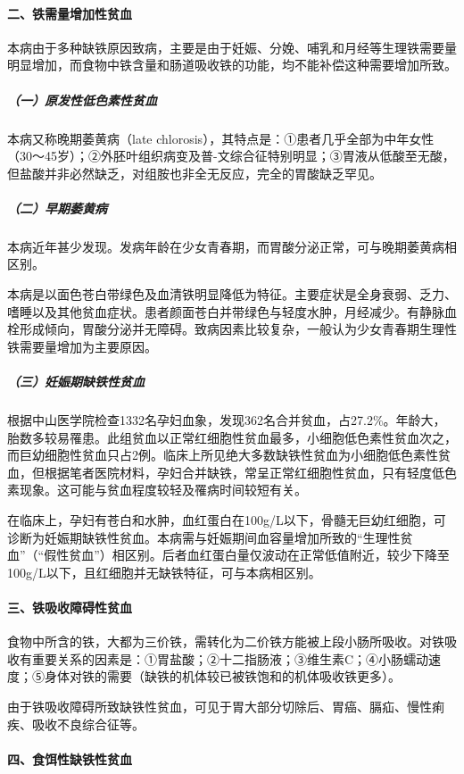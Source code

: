 \paragraph{二、铁需量增加性贫血}

本病由于多种缺铁原因致病，主要是由于妊娠、分娩、哺乳和月经等生理铁需要量明显增加，而食物中铁含量和肠道吸收铁的功能，均不能补偿这种需要增加所致。

\subparagraph{（一）原发性低色素性贫血}

本病又称晚期萎黄病（late
chlorosis），其特点是：①患者几乎全部为中年女性（30～45岁）；②外胚叶组织病变及普-文综合征特别明显；③胃液从低酸至无酸，但盐酸并非必然缺乏，对组胺也非全无反应，完全的胃酸缺乏罕见。

\subparagraph{（二）早期萎黄病}

本病近年甚少发现。发病年龄在少女青春期，而胃酸分泌正常，可与晚期萎黄病相区别。

本病是以面色苍白带绿色及血清铁明显降低为特征。主要症状是全身衰弱、乏力、嗜睡以及其他贫血症状。患者颜面苍白并带绿色与轻度水肿，月经减少。有静脉血栓形成倾向，胃酸分泌并无障碍。致病因素比较复杂，一般认为少女青春期生理性铁需要量增加为主要原因。

\subparagraph{（三）妊娠期缺铁性贫血}

根据中山医学院检查1332名孕妇血象，发现362名合并贫血，占27.2\%。年龄大，胎数多较易罹患。此组贫血以正常红细胞性贫血最多，小细胞低色素性贫血次之，而巨幼细胞性贫血只占2例。临床上所见绝大多数缺铁性贫血为小细胞低色素性贫血，但根据笔者医院材料，孕妇合并缺铁，常呈正常红细胞性贫血，只有轻度低色素现象。这可能与贫血程度较轻及罹病时间较短有关。

在临床上，孕妇有苍白和水肿，血红蛋白在100g/L以下，骨髓无巨幼红细胞，可诊断为妊娠期缺铁性贫血。本病需与妊娠期间血容量增加所致的“生理性贫血”（“假性贫血”）相区别。后者血红蛋白量仅波动在正常低值附近，较少下降至100g/L以下，且红细胞并无缺铁特征，可与本病相区别。

\paragraph{三、铁吸收障碍性贫血}

食物中所含的铁，大都为三价铁，需转化为二价铁方能被上段小肠所吸收。对铁吸收有重要关系的因素是：①胃盐酸；②十二指肠液；③维生素C；④小肠蠕动速度；⑤身体对铁的需要（缺铁的机体较已被铁饱和的机体吸收铁更多）。

由于铁吸收障碍所致缺铁性贫血，可见于胃大部分切除后、胃癌、膈疝、慢性痢疾、吸收不良综合征等。

\paragraph{四、食饵性缺铁性贫血}

